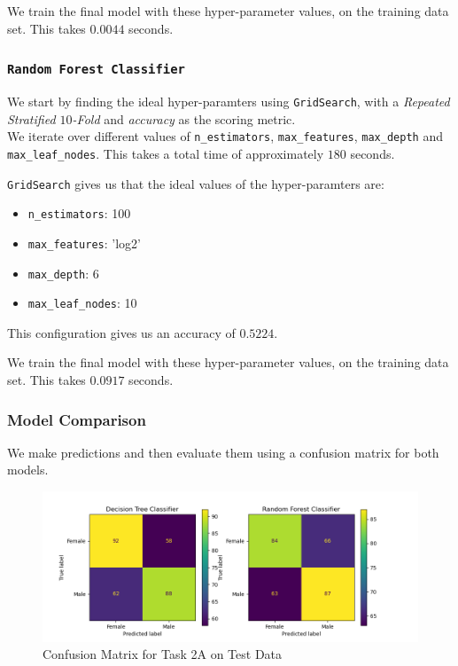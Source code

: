 \documentclass{article}
\begin{document}
    We train the final model with these hyper-parameter values, on the training data set. This takes $0.0044$ seconds.

\subsubsection{\texttt{Random Forest Classifier}}
    We start by finding the ideal hyper-paramters using \verb|GridSearch|, with a \textit{Repeated Stratified $10$-Fold} and \textit{accuracy} as the scoring metric. \\
    We iterate over different values of \verb|n_estimators|, \verb|max_features|, \verb|max_depth| and \verb|max_leaf_nodes|. This takes a total time of approximately $180$ seconds.

    \verb|GridSearch| gives us that the ideal values of the hyper-paramters are:
    \begin{itemize}
        \item \verb|n_estimators|: 100
        \item \verb|max_features|: 'log2'
        \item \verb|max_depth|: 6
        \item \verb|max_leaf_nodes|: 10
    \end{itemize}
    This configuration gives us an accuracy of $0.5224$.

    We train the final model with these hyper-parameter values, on the training data set. This takes $0.0917$ seconds.

\subsubsection{Model Comparison}
    We make predictions and then evaluate them using a confusion matrix for both models.
    \begin{figure}[h]
        \centering
        \includegraphics[width=\linewidth]{Task 2A.png}
        \caption{Confusion Matrix for Task 2A on Test Data}
        \end{figure}
\end{document}
